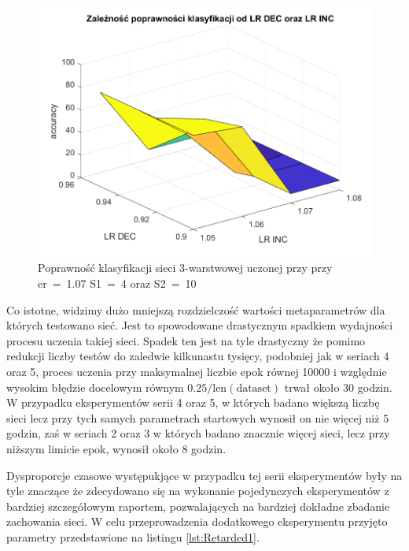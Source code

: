 \documentclass[12pt,twoside]{article}
\begin{document}
\begin{figure}[ht]
	\centering
	\includegraphics[width=16cm]{figures/Retarded_1.png}
	\caption{Poprawność klasyfikacji sieci 3-warstwowej uczonej przy  przy er~=~1.07 S1~=~4 oraz S2~=~10}
	\label{Fig:Retarded1}
\end{figure}
Co istotne, widzimy dużo mniejszą rozdzielczość wartości metaparametrów dla których testowano sieć.
Jest to spowodowane drastycznym spadkiem wydajności procesu uczenia takiej sieci.
Spadek ten jest na tyle drastyczny że pomimo redukcji liczby testów do zaledwie kilkunastu tysięcy, podobniej jak w seriach 4 oraz 5, proces uczenia przy maksymalnej liczbie epok równej 10000 i względnie wysokim błędzie docelowym równym $0.25/\text{len}(\text{dataset})$ trwał około 30 godzin.
W przypadku eksperymentów serii 4 oraz 5, w których badano większą liczbę sieci lecz przy tych samych parametrach startowych wynosił on nie więcej niż 5 godzin, zaś w seriach 2 oraz 3 w których badano znacznie więcej sieci, lecz przy niższym limicie epok, wynosił około 8 godzin.

Dysproporcje czasowe występukjące w przypadku tej serii eksperymentów były na tyle znaczące że zdecydowano się na wykonanie pojedynczych eksperymentów z bardziej szczegółowym raportem, pozwalających na bardziej dokładne zbadanie zachowania sieci.
W celu przeprowadzenia dodatkowego eksperymentu przyjęto parametry przedstawione na listingu \ref{lst:Retarded1}.
\end{document}
